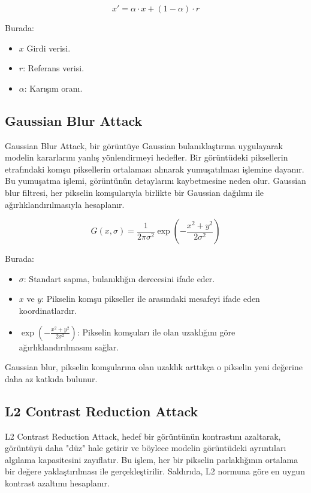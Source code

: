 \[ x' = \alpha \cdot x + (1 - \alpha) \cdot r \]

Burada:

\begin{itemize}
    \item $x$ Girdi verisi.
    \item $r$: Referans verisi.
    \item $\alpha$: Karışım oranı.
\end{itemize}

\newpage

\subsection{Gaussian Blur Attack}

Gaussian Blur Attack, bir görüntüye Gaussian bulanıklaştırma uygulayarak modelin kararlarını yanlış yönlendirmeyi hedefler. Bir görüntüdeki piksellerin etrafındaki komşu piksellerin ortalaması alınarak yumuşatılması işlemine dayanır. Bu yumuşatma işlemi, görüntünün detaylarını kaybetmesine neden olur. Gaussian blur filtresi, her pikselin komşularıyla birlikte bir Gaussian dağılımı ile ağırlıklandırılmasıyla hesaplanır.

\[ G(x, \sigma) = \frac{1}{2\pi\sigma^2} \exp\left(-\frac{x^2 + y^2}{2\sigma^2}\right) \]

Burada:

\begin{itemize}
    \item $\sigma$: Standart sapma, bulanıklığın derecesini ifade eder.
    \item $x$ ve $y$: Pikselin komşu pikseller ile arasındaki mesafeyi ifade eden koordinatlardır.
    \item $\exp\left(-\frac{x^2 + y^2}{2\sigma^2}\right)$: Pikselin komşuları ile olan uzaklığını göre ağırlıklandırılmasını sağlar.
\end{itemize}

Gaussian blur, pikselin komşularına olan uzaklık arttıkça o pikselin yeni değerine daha az katkıda bulunur.

\newpage

\subsection{L2 Contrast Reduction Attack}

L2 Contrast Reduction Attack, hedef bir görüntünün kontrastını azaltarak, görüntüyü daha "düz" hale getirir ve böylece modelin görüntüdeki ayrıntıları algılama kapasitesini zayıflatır. Bu işlem, her bir pikselin parlaklığının ortalama bir değere yaklaştırılması ile gerçekleştirilir. Saldırıda, L2 normuna göre en uygun kontrast azaltımı hesaplanır.


